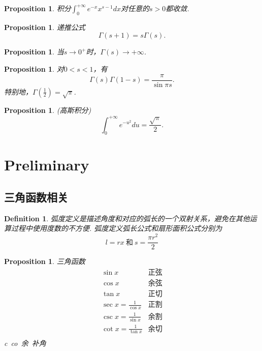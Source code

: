 \documentclass{article}
\newtheorem{proposition}[theorem]{Proposition}
\newtheorem{definition}[theorem]{Definition}
\begin{document}
\begin{proposition}
\rm 积分$\int_0^{+\infty} e^{-x}x^{s-1}dx$对任意的$s > 0$都收敛.
\end{proposition}

\begin{proposition}
\rm 递推公式
$$
\Gamma(s+1) = s\Gamma(s). 
$$
\end{proposition}

\begin{proposition}
\rm 当$s \rightarrow 0^+$时，$\Gamma(s) \rightarrow +\infty$.
\end{proposition}

\begin{proposition}
\rm 对$0<s<1$，有
$$
\Gamma(s)\Gamma(1-s) = \frac{\pi}{\sin \pi s}. 
$$
特别地，$\Gamma(\frac{1}{2})=\sqrt{\pi}$.
\end{proposition}

\begin{proposition}
\rm {\color{red} (高斯积分)}
$$
\int_0^{+\infty} e^{-u^2} du = \frac{\sqrt{\pi}}{2}.
$$
\end{proposition}


\newpage
\section{Preliminary}

\subsection{三角函数相关}
\begin{definition}
\rm 弧度定义是{\color{red}描述角度和对应的弧长的一个双射关系}，避免在其他运算过程中使用度数的不方便. 弧度定义{\color{red}弧长公式}和{\color{red}扇形面积公式}分别为
$$
l = rx ~\text{和}~ s = \frac{\pi r^2}{2}
$$
\end{definition}

\begin{proposition}
\rm 三角函数
$$
\begin{array}{ll}
\sin x & \text{正弦} \\
\cos x & \text{余弦} \\
\tan x & \text{正切} \\
\sec x = \frac{1}{\cos x} & \text{正割} \\
\csc x = \frac{1}{\sin x} & \text{余割} \\
\cot x = \frac{1}{\tan x} & \text{余切} \\
\end{array}
$$
c~co~余~补角
\end{proposition}
\end{document}
